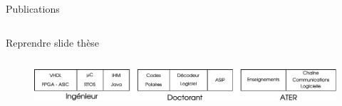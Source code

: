 \documentclass[t,compress,mathserif,12pt,xcolor=dvipsnames]{beamer}
\begin{document}
\begin{frame}[t]{Publications}
  \begin{minipage}[t][5.0cm][t]{\textwidth}
    \begin{columns}
      \begin{column}{0.63\textwidth}
        \vspace{-30pt}
        Reprendre slide thèse
      \end{column}
      \begin{column}{0.04\textwidth}

      \end{column}
      \begin{column}{0.33\textwidth}
      \end{column}
    \end{columns}
  \end{minipage}
  \begin{figure}[htp]
    \centering
    \includegraphics[width=\textwidth]{fig/frise}
  \end{figure}



\end{frame}
\end{document}
